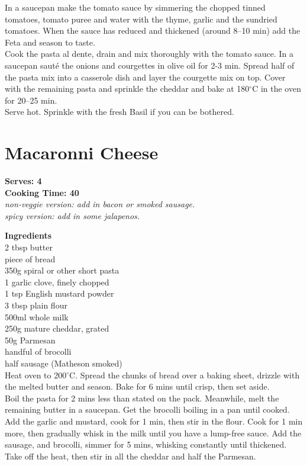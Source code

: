 \documentclass[18pt, oneside]{book}
\begin{document}
In a saucepan make the tomato sauce by simmering the chopped tinned tomatoes, tomato puree and water with the thyme, garlic and the sundried tomatoes. When the sauce has reduced and thickened (around 8--10 min) add the Feta and season to taste.\\

Cook the pasta al dente, drain and mix thoroughly with the tomato sauce. In a saucepan sauté the onions and courgettes in olive oil for 2-3 min. Spread half of the pasta mix into a casserole dish and layer the courgette mix on top. Cover with the remaining pasta and sprinkle the cheddar and bake at 180$^{\circ}$C in the oven for 20--25 min. \\

Serve hot. Sprinkle with the fresh Basil if you can be bothered.
  

\section{Macaronni Cheese}
\textbf{Serves: 4} \\
\textbf{Cooking Time: 40} \\

\textit{non-veggie version: add in bacon or smoked sausage. \\
spicy version: add in some jalapenos. \\}

\textbf{Ingredients} \\
2 tbsp butter \\
piece of bread \\
350g spiral or other short pasta \\
1 garlic clove, finely chopped \\
1 tsp English mustard powder \\
3 tbsp plain flour \\
500ml whole milk \\
250g mature cheddar, grated \\
50g Parmesan \\
handful of brocolli \\
half sausage (Matheson smoked) \\

Heat oven to 200$^\circ$C. Spread the chunks of bread over a baking sheet, drizzle with the melted butter and season. Bake for 6 mins until crisp, then set aside. \\

Boil the pasta for 2 mins less than stated on the pack. Meanwhile, melt the remaining butter in a saucepan. Get the brocolli boiling in a pan until cooked. Add the garlic and mustard, cook for 1 min, then stir in the flour. Cook for 1 min more, then gradually whisk in the milk until you have a lump-free sauce. Add the sausage, and brocolli, simmer for 5 mins, whisking constantly until thickened. Take off the heat, then stir in all the cheddar and half the Parmesan.\\
\end{document}
